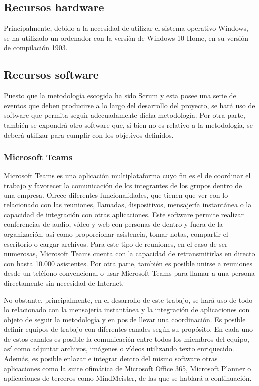 \subsection{Recursos hardware}
Principalmente, debido a la necesidad de utilizar el sistema operativo Windows, se ha utilizado un ordenador con la versión de Windows 10 Home, en su versión de compilación 1903.

\subsection{Recursos software}
Puesto que la metodología escogida ha sido Scrum y esta posee una serie de eventos que deben producirse a lo largo del desarrollo del proyecto, se hará uso de software que permita seguir adecuadamente dicha metodología. Por otra parte, también se expondrá otro software que, si bien no es relativo a la metodología, se deberá utilizar para cumplir con los objetivos definidos.

\subsubsection{Microsoft Teams}
Microsoft Teams \cite{microsoftteams} es una aplicación multiplataforma cuyo fin es el de coordinar el trabajo y favorecer la comunicación de los integrantes de los grupos dentro de una empresa. Ofrece diferentes funcionalidades, que tienen que ver con lo relacionado con las reuniones, llamadas, dispositivos, mensajería instantánea o la capacidad de integración con otras aplicaciones. Este software permite realizar conferencias de audio, vídeo y web con personas de dentro y fuera de la organización, así como proporcionar asistencia, tomar notas, compartir el escritorio o cargar archivos. Para este tipo de reuniones, en el caso de ser numerosas, Microsoft Teams cuenta con la capacidad de retransmitirlas en directo con hasta 10.000 asistentes. Por otra parte, también es posible unirse a reuniones desde un teléfono convencional o usar Microsoft Teams para llamar a una persona directamente sin necesidad de Internet.

No obstante, principalmente, en el desarrollo de este trabajo, se hará uso de todo lo relacionado con la mensajería instantánea y la integración de aplicaciones con objeto de seguir la metodología y en pos de llevar una coordinación. Es posible definir equipos de trabajo con diferentes canales según su propósito. En cada uno de estos canales es posible la comunicación entre todos los miembros del equipo, así como adjuntar archivos, imágenes o vídeos utilizando texto enriquecido. Además, es posible enlazar e integrar dentro del mismo software otras aplicaciones como la suite ofimática de Microsoft Office 365, Microsoft Planner o aplicaciones de terceros como MindMeister, de las que se hablará a continuación.

